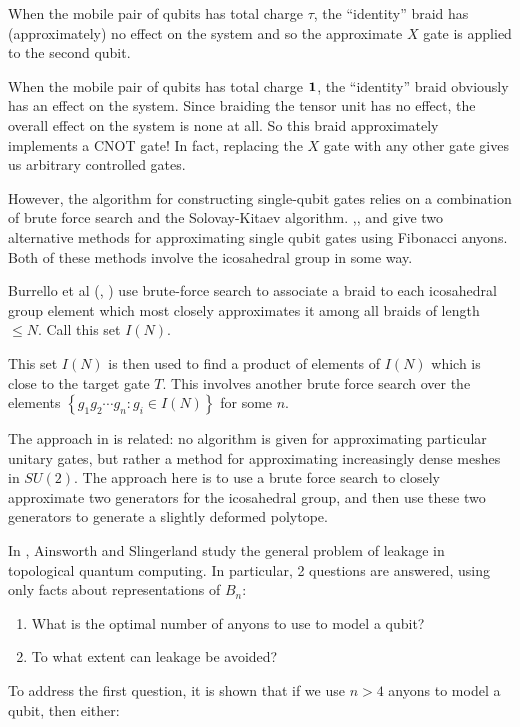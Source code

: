 When the mobile pair of qubits has total charge $\tau$, the ``identity'' braid
has (approximately) no effect on the system and so the approximate $X$ gate is
applied to the second qubit.

When the mobile pair of qubits has total charge $\mathbf{1}$, the ``identity'' braid
obviously has an effect on the system. Since braiding the tensor unit has no
effect, the overall effect on the system is none at all. So this braid
approximately implements a CNOT gate! In fact, replacing the $X$ gate with any
other gate gives us arbitrary controlled gates.

However, the algorithm for constructing single-qubit gates relies on a
combination of brute force search and the Solovay-Kitaev algorithm.
\cite{Burrello2010},\cite{Burrello2011}, and \cite{Mosseri2008} give 
two alternative methods for approximating single qubit gates using Fibonacci
anyons. Both of these methods involve the icosahedral group in some way.

Burrello et al (\cite{Burrello2010}, \cite{Burrello2011}) use brute-force
search to associate a braid to each icosahedral group element which most
closely approximates it among all braids of length $\leq N$. Call this set
$I(N)$.

This set $I(N)$ is then used to find a product of elements of $I(N)$ which
is close to the target gate $T$. This involves another brute force search over
the elements $\left\{ g_1g_2\cdots g_n: g_i \in I(N) \right\}$ for some $n$. 

The approach in \cite{Mosseri2008} is related: no algorithm is given
for approximating particular unitary gates, but rather a method for
approximating increasingly dense meshes in $SU(2)$. The approach here is to
use a brute force search to closely approximate two generators for the
icosahedral group, and then use these two generators to generate a slightly
deformed polytope.

In \cite{Ainsworth2011}, Ainsworth and Slingerland study the general problem of
leakage in topological quantum computing.  In particular, 2 questions are
answered, using only facts about representations of $B_n$:

\begin{enumerate}
\item What is the optimal number of anyons to use to model a qubit?
\item To what extent can leakage be avoided?
\end{enumerate}

To address the first question, it is shown that if we use $n > 4$ anyons to
model a qubit, then either:

